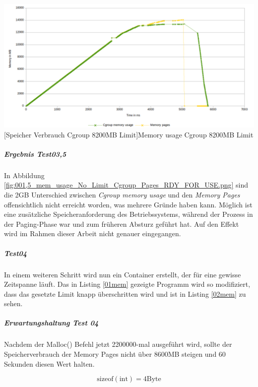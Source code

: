 \vspace{1em}
\begin{minipage}{\linewidth}
	\centering
	\includegraphics[width=1\linewidth]{pics/001,5_mem_usage_No_Limit_Cgroup_Pages_RDY_FOR_USE.png}
	[Speicher Verbrauch Cgroup 8200MB Limit]{Memory usage Cgroup 8200MB Limit}
	\label{fig:001,5_mem_usage_No_Limit_Cgroup_Pages_RDY_FOR_USE.png}
\end{minipage}

\subparagraph{Ergebnis Test03,5}
In Abbildung \ref{fig:001,5_mem_usage_No_Limit_Cgroup_Pages_RDY_FOR_USE.png} sind die 2GB Unterschied zwischen \emph{Cgroup memory usage} und den \emph{Memory Pages} offensichtlich nicht erreicht worden, was mehrere Gründe haben kann. Möglich ist eine zusätzliche Speicheranforderung des Betriebssystems, während der Prozess in der Paging-Phase war und zum früheren Absturz geführt hat. Auf den Effekt wird im Rahmen dieser Arbeit nicht genauer eingegangen.



\subparagraph{Test04}
In einem weiteren Schritt wird nun ein Container erstellt, der für eine gewisse Zeitspanne läuft. Das in Listing \ref{01mem} gezeigte Programm wird so modifiziert, dass das gesetzte Limit knapp überschritten wird und ist in Listing \ref{02mem} zu sehen. 

\vspace{1em}


\subparagraph{Erwartungshaltung Test 04}
Nachdem der Malloc() Befehl jetzt 2200000-mal ausgeführt wird, sollte der Speicherverbrauch der Memory Pages nicht über 8600MB steigen und 60 Sekunden diesen Wert halten.



\[\mathrm{sizeof(int)} = 4 \mathrm{Byte}\]

